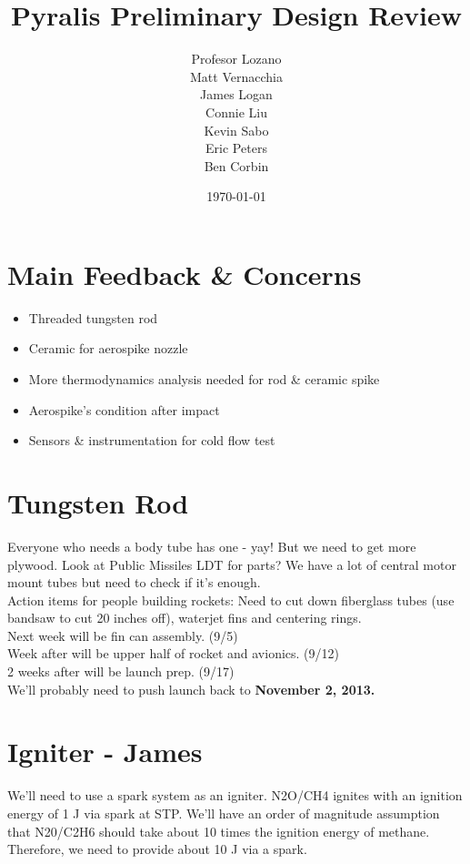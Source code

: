 \documentclass[12pt]{article}
\title{Pyralis Preliminary Design Review} %
\author{Profesor Lozano\\Matt Vernacchia\\James Logan\\Connie Liu\\Kevin Sabo\\Eric Peters\\Ben Corbin }
\date{ \today } %
\begin{document}
\maketitle

\section*{Main Feedback \& Concerns}

\begin{itemize}
\item Threaded tungsten rod
\item Ceramic for aerospike nozzle
\item More thermodynamics analysis needed for rod \& ceramic spike
\item Aerospike's condition after impact
\item Sensors \& instrumentation for cold flow test
\end{itemize}

\section{Tungsten Rod}
Everyone who needs a body tube has one - yay! But we need to get more plywood. Look at Public Missiles LDT for parts? We have a lot of central motor mount tubes but need to check if it's enough.\\

\noindent Action items for people building rockets: Need to cut down fiberglass tubes (use bandsaw to cut 20 inches off), waterjet fins and centering rings.\\

\noindent Next week will be fin can assembly. (9/5) \\
Week after will be upper half of rocket and avionics. (9/12)\\
2 weeks after will be launch prep. (9/17)\\

\noindent We'll probably need to push launch back to \textbf{November 2, 2013.}

\section{Igniter - James}
We'll need to use a spark system as an igniter. N2O/CH4 ignites with an ignition energy of 1 J via spark at STP. We'll have an order of magnitude assumption that N20/C2H6 should take about 10 times the ignition energy of methane. Therefore, we need to provide about 10 J via a spark.
\end{document}
